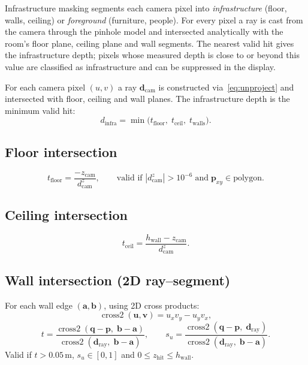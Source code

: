 \documentclass[a4paper, 11pt]{article}
\newcommand{\vect}[1]{\bm{#1}}
\begin{document}
Infrastructure masking segments each camera pixel into
\emph{infrastructure} (floor, walls, ceiling) or \emph{foreground}
(furniture, people).  For every pixel a ray is cast from the camera
through the pinhole model and intersected analytically with the room's
floor plane, ceiling plane and wall segments.  The nearest valid hit
gives the infrastructure depth; pixels whose measured depth is close to
or beyond this value are classified as infrastructure and can be
suppressed in the display.

For each camera pixel $(u, v)$ a ray
$\vect{d}_{\text{cam}}$ is constructed via~\eqref{eq:unproject} and
intersected with floor, ceiling and wall planes.
The infrastructure depth is the minimum valid hit:
\begin{equation}
  d_{\text{infra}} = \min\bigl(t_{\text{floor}},\; t_{\text{ceil}},\;
                               t_{\text{walls}}\bigr).
\end{equation}

\subsection{Floor intersection}

\begin{equation}
  t_{\text{floor}}
  = \frac{-z_{\text{cam}}}{d_{\text{cam}}^z},
  \qquad
  \text{valid if } |d_{\text{cam}}^z| > 10^{-6}
  \;\text{and}\;
  \vect{p}_{xy} \in \text{polygon}.
\end{equation}

\subsection{Ceiling intersection}

\begin{equation}
  t_{\text{ceil}}
  = \frac{h_{\text{wall}} - z_{\text{cam}}}{d_{\text{cam}}^z}.
\end{equation}

\subsection{Wall intersection (2D ray--segment)}

For each wall edge $(\vect{a}, \vect{b})$, using 2D cross products:
\begin{equation}
  \operatorname{cross2}(\vect{u}, \vect{v}) = u_x v_y - u_y v_x,
\end{equation}
\begin{equation}
  t = \frac{\operatorname{cross2}(\vect{q} - \vect{p},\; \vect{b} - \vect{a})}
           {\operatorname{cross2}(\vect{d}_{\text{ray}},\; \vect{b} - \vect{a})},
  \qquad
  s_u = \frac{\operatorname{cross2}(\vect{q} - \vect{p},\; \vect{d}_{\text{ray}})}
             {\operatorname{cross2}(\vect{d}_{\text{ray}},\; \vect{b} - \vect{a})}.
\end{equation}
Valid if $t > 0.05\,$m, $s_u \in [0, 1]$ and
$0 \leq z_{\text{hit}} \leq h_{\text{wall}}$.
\end{document}

